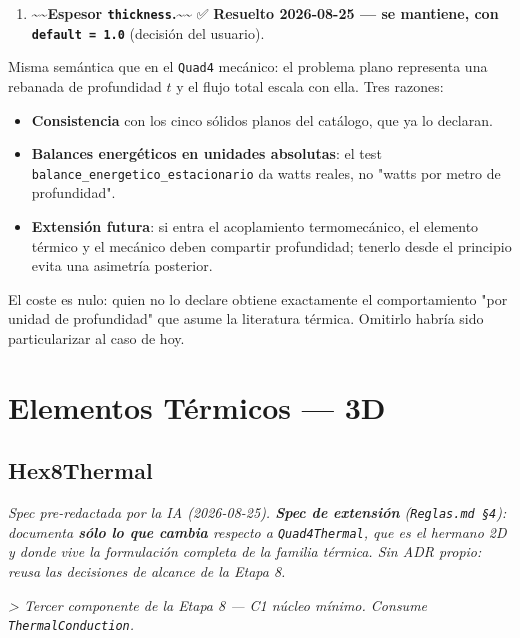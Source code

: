 \documentclass[11pt,letterpaper,oneside]{report}
\begin{document}
\begin{enumerate}
  \item \textasciitilde{}\textasciitilde{}\textbf{Espesor \texttt{thickness}.}\textasciitilde{}\textasciitilde{} ✅ \textbf{Resuelto 2026-08-25 --- se mantiene, con \texttt{default = 1.0}} (decisión del usuario).
\end{enumerate}

   Misma semántica que en el \texttt{Quad4} mecánico: el problema plano representa una rebanada de profundidad $t$ y el flujo total escala con ella. Tres razones:

\begin{itemize}
  \item \textbf{Consistencia} con los cinco sólidos planos del catálogo, que ya lo declaran.
  \item \textbf{Balances energéticos en unidades absolutas}: el test \texttt{balance\_energetico\_estacionario} da watts reales, no "watts por metro de profundidad".
  \item \textbf{Extensión futura}: si entra el acoplamiento termomecánico, el elemento térmico y el mecánico deben compartir profundidad; tenerlo desde el principio evita una asimetría posterior.
\end{itemize}

   El coste es nulo: quien no lo declare obtiene exactamente el comportamiento "por unidad de profundidad" que asume la literatura térmica. Omitirlo habría sido particularizar al caso de hoy.


\newpage

\chapter{Elementos Térmicos — 3D}

\section{Hex8Thermal}



\textit{Spec pre-redactada por la IA (2026-08-25). \textbf{Spec de extensión} (\texttt{Reglas.md §4}): documenta \textbf{sólo lo que cambia} respecto a \texttt{Quad4Thermal}, que es el hermano 2D y donde vive la formulación completa de la familia térmica. Sin ADR propio: reusa las decisiones de alcance de la Etapa 8.}

\textit{> Tercer componente de la Etapa 8 --- C1 núcleo mínimo. Consume \texttt{ThermalConduction}.}
\end{document}
